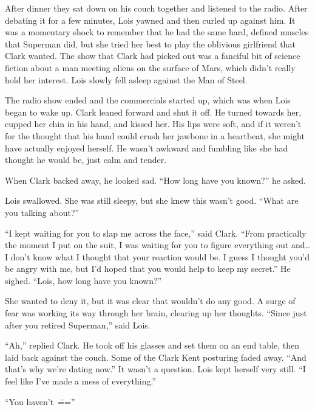 After dinner they sat down on his couch together and listened to the
radio. After debating it for a few minutes, Lois yawned and then curled
up against him. It was a momentary shock to remember that he had the
same hard, defined muscles that Superman did, but she tried her best to
play the oblivious girlfriend that Clark wanted. The show that Clark had
picked out was a fanciful bit of science fiction about a man meeting
aliens on the surface of Mars, which didn't really hold her interest.
Lois slowly fell asleep against the Man of Steel.

The radio show ended and the commercials started up, which was when Lois
began to wake up. Clark leaned forward and shut it off. He turned
towards her, cupped her chin in his hand, and kissed her. His lips were
soft, and if it weren't for the thought that his hand could crush her
jawbone in a heartbeat, she might have actually enjoyed herself. He
wasn't awkward and fumbling like she had thought he would be, just calm
and tender.

When Clark backed away, he looked sad. ``How long have you known?'' he
asked.

Lois swallowed. She was still sleepy, but she knew this wasn't good.
``What are you talking about?''

``I kept waiting for you to slap me across the face,'' said Clark.
``From practically the moment I put on the suit, I was waiting for you
to figure everything out and\ldots{} I don't know what I thought that
your reaction would be. I guess I thought you'd be angry with me, but
I'd hoped that you would help to keep my secret.'' He sighed. ``Lois,
how long have you known?''

She wanted to deny it, but it was clear that wouldn't do any good. A
surge of fear was working its way through her brain, clearing up her
thoughts. ``Since just after you retired Superman,'' said Lois.

``Ah,'' replied Clark. He took off his glasses and set them on an end
table, then laid back against the couch. Some of the Clark Kent
posturing faded away. ``And that's why we're dating now.'' It wasn't a
question. Lois kept herself very still. ``I feel like I've made a mess
of everything.''

``You haven't~\===''

